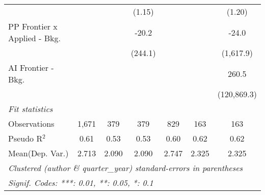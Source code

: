 \begin{tabular}{lcccccc}
                                &                &              & (1.15)      &                &             & (1.20)\\   
   PP Frontier x Applied - Bkg. &                &              & -20.2       &                &             & -24.0\\   
                                &                &              & (244.1)     &                &             & (1,617.9)\\   
   AI Frontier - Bkg.           &                &              &             &                &             & 260.5\\   
                                &                &              &             &                &             & (120,869.3)\\   
   \midrule
   \emph{Fit statistics}\\
   Observations                 & 1,671          & 379          & 379         & 829            & 163         & 163\\  
   Pseudo R$^2$                 & 0.61           & 0.53         & 0.53        & 0.60           & 0.62        & 0.62\\  
Mean(Dep. Var.) & 2.713 & 2.090 & 2.090 & 2.747 & 2.325 & 2.325 \\
   \midrule \midrule
   \multicolumn{7}{l}{\emph{Clustered (author \& quarter\_year) standard-errors in parentheses}}\\
   \multicolumn{7}{l}{\emph{Signif. Codes: ***: 0.01, **: 0.05, *: 0.1}}\\
\end{tabular}
\par\endgroup
